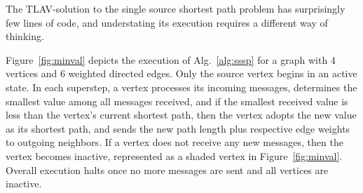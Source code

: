 \documentclass[reprint,twocolumn,showpacs,preprintnumbers,amsmath, aps,pre,amssymb]{revtex4-1}
\begin{document}
The TLAV-solution to the single source shortest path problem has surprisingly few lines of code, and understating its execution requires a different way of thinking.  

Figure~\ref{fig:minval} depicts the execution of Alg.~\ref{alg:sssp} for a graph with 4 vertices and 6 weighted directed edges. Only the source vertex begins in an active state.  In each superstep, a vertex processes its incoming messages, determines the smallest value among all messages received, and if the smallest received value is less than the vertex's current shortest path, then the vertex adopts the new value as its shortest path, and sends the new path length plus respective edge weights to outgoing neighbors.  If a vertex does not receive any new messages, then the vertex becomes inactive, represented as a shaded vertex in Figure~\ref{fig:minval}.  Overall execution halts once no more messages are sent and all vertices are inactive.
\end{document}
